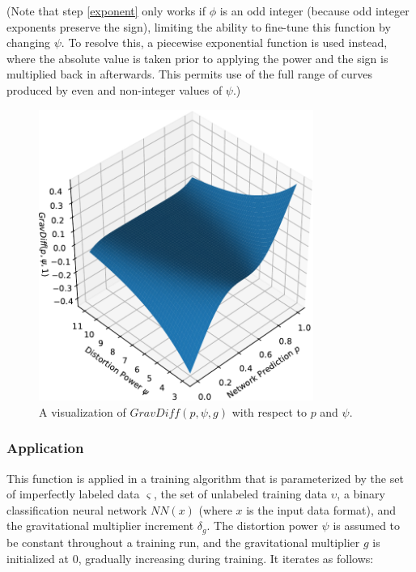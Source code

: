 \documentclass[10pt]{article}
\begin{document}
(Note that step \ref{exponent} only works if $\phi$ is an odd integer (because odd integer exponents preserve the sign), limiting the ability to fine-tune this function by changing $\psi$. To resolve this, a piecewise exponential function is used instead, where the absolute value is taken prior to applying the power and the sign is multiplied back in afterwards. This permits use of the full range of curves produced by even and non-integer values of $\psi$.)

\begin{figure}[h]
    \centering
    \includegraphics[width=0.8\textwidth]{grav_diff}
    \caption{\label{grav_diff} A visualization of $GravDiff(p, \psi, g)$ with respect to $p$ and $\psi$.}
\end{figure}

\subsubsection{Application}

This function is applied in a training algorithm that is parameterized by the set of imperfectly labeled data $\varsigma$, the set of unlabeled training data $\upsilon$, a binary classification neural network $NN(x)$ (where $x$ is the input data format), and the gravitational multiplier increment $\delta_g$. The distortion power $\psi$ is assumed to be constant throughout a training run, and the gravitational multiplier $g$ is initialized at 0, gradually increasing during training. It iterates as follows:
\end{document}
